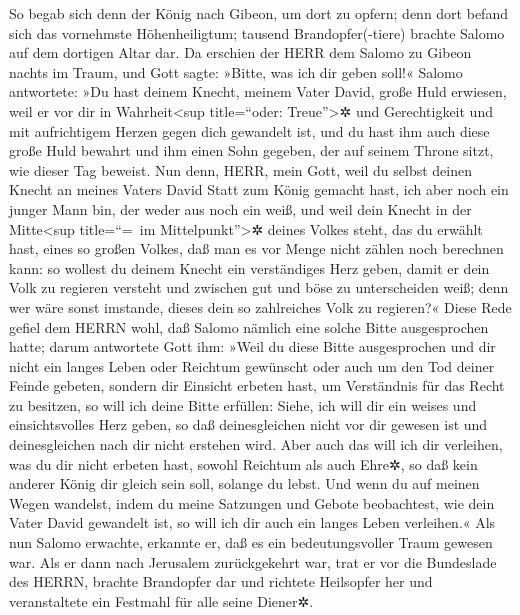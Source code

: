 So begab sich denn der König nach Gibeon, um dort zu
opfern; denn dort befand sich das vornehmste Höhenheiligtum; tausend
Brandopfer(-tiere) brachte Salomo auf dem dortigen Altar dar.
Da erschien der HERR dem Salomo zu Gibeon nachts im Traum,
und Gott sagte: »Bitte, was ich dir geben soll!« Salomo
antwortete: »Du hast deinem Knecht, meinem Vater David, große Huld
erwiesen, weil er vor dir in Wahrheit\textless sup title=``oder:
Treue''\textgreater✲ und Gerechtigkeit und mit aufrichtigem Herzen gegen
dich gewandelt ist, und du hast ihm auch diese große Huld bewahrt und
ihm einen Sohn gegeben, der auf seinem Throne sitzt, wie dieser Tag
beweist. Nun denn, HERR, mein Gott, weil du selbst deinen
Knecht an meines Vaters David Statt zum König gemacht hast, ich aber
noch ein junger Mann bin, der weder aus noch ein weiß, und
weil dein Knecht in der Mitte\textless sup title=``=~im
Mittelpunkt''\textgreater✲ deines Volkes steht, das du erwählt hast,
eines so großen Volkes, daß man es vor Menge nicht zählen noch berechnen
kann: so wollest du deinem Knecht ein verständiges Herz
geben, damit er dein Volk zu regieren versteht und zwischen gut und böse
zu unterscheiden weiß; denn wer wäre sonst imstande, dieses dein so
zahlreiches Volk zu regieren?« Diese Rede gefiel dem
HERRN wohl, daß Salomo nämlich eine solche Bitte ausgesprochen hatte;
darum antwortete Gott ihm: »Weil du diese Bitte
ausgesprochen und dir nicht ein langes Leben oder Reichtum gewünscht
oder auch um den Tod deiner Feinde gebeten, sondern dir Einsicht erbeten
hast, um Verständnis für das Recht zu besitzen, so will
ich deine Bitte erfüllen: Siehe, ich will dir ein weises und
einsichtsvolles Herz geben, so daß deinesgleichen nicht vor dir gewesen
ist und deinesgleichen nach dir nicht erstehen wird. Aber
auch das will ich dir verleihen, was du dir nicht erbeten hast, sowohl
Reichtum als auch Ehre✲, so daß kein anderer König dir gleich sein soll,
solange du lebst. Und wenn du auf meinen Wegen wandelst,
indem du meine Satzungen und Gebote beobachtest, wie dein Vater David
gewandelt ist, so will ich dir auch ein langes Leben verleihen.«
Als nun Salomo erwachte, erkannte er, daß es ein
bedeutungsvoller Traum gewesen war. Als er dann nach Jerusalem
zurückgekehrt war, trat er vor die Bundeslade des HERRN, brachte
Brandopfer dar und richtete Heilsopfer her und veranstaltete ein
Festmahl für alle seine Diener✲.


